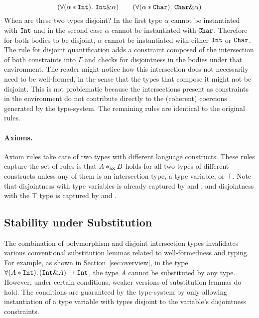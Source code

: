 \[ (\forall (\alpha * \texttt{Int}).~\texttt{Int} \& \alpha) \qquad 
(\forall (\alpha * \texttt{Char}). ~\texttt{Char} \& \alpha) \]
When are these two types disjoint?
In the first type $\alpha$ cannot be instantiated with $\texttt{Int}$ and in
the second case $\alpha$ cannot be instantiated with $\texttt{Char}$.
Therefore for both bodies to be disjoint, $\alpha$ cannot be instantiated with either $\texttt{Int}$ 
or $\texttt{Char}$. 
The rule for disjoint quantification adds a constraint composed of the intersection of both constraints into $\Gamma$ and checks for 
disjointness in the bodies under that environment.
The reader might notice how this intersection does not necessarily need to be well-formed,
in the sense that the types that compose it might not be disjoint.
This is not problematic because the intersections present as constraints in the environment
do not contribute directly to the (coherent) coercions generated by the type-system.
The remaining rules are identical to the original rules. 

\paragraph{Axioms.} Axiom rules take care of two types with different language constructs.
These rules capture the set of rules is that $A *_\textnormal{ax} B$ holds for all 
two types of different constructs unless any of them is an intersection type, a type variable,
or $\top$.
Note that disjointness with type variables is already captured by  and 
, and disjointness with the $\top$ type is captured by 
{} and {}.

\subsection{Stability under Substitution}
The combination of polymorphism and disjoint intersection types
invalidates various conventional substitution lemmas related to
well-formedness and typing.  
For example, as shown in Section~\ref{sec:overview}, in the type 
$\forall (A * \texttt{Int}).\, (\texttt{Int} \& A) \to \texttt{Int}$, the type $A$ cannot be substituted by any type.
However, under certain conditions, weaker versions of substitution lemmas do hold. 
The conditions are guaranteed by the type-system by only
allowing instantiation of a type variable with types disjoint to the
variable's disjointness constraints.

